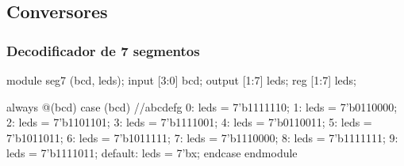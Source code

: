 \subsection{Conversores}


\begin{frame}[fragile]
	\frametitle{Decodificador de 7 segmentos}
	\begin{verilogcode}
module seg7 (bcd, leds); 
  input [3:0] bcd; 
  output [1:7] leds; 
  reg [1:7] leds;

  always @(bcd)
    case (bcd)   //abcdefg
      0: leds = 7'b1111110; 
      1: leds = 7'b0110000; 
      2: leds = 7'b1101101; 
      3: leds = 7'b1111001; 
      4: leds = 7'b0110011; 
      5: leds = 7'b1011011; 
      6: leds = 7'b1011111; 
      7: leds = 7'b1110000; 
      8: leds = 7'b1111111; 
      9: leds = 7'b1111011; 
      default: leds = 7'bx;
    endcase 
endmodule
    \end{verilogcode} 
\end{frame}

